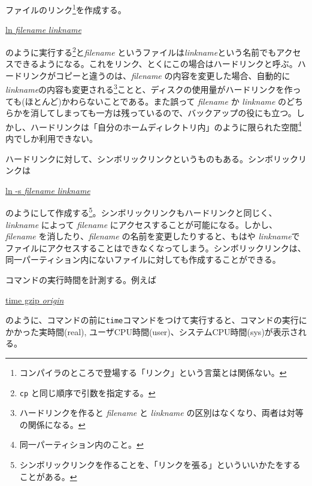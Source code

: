 \begin{itemize}

          ファイルのリンク\footnote{コンパイラのところで登場する「リンク」という言葉とは関係ない。}を作成する。
          \begin{commandline2}
              \prompt \underline{ln \textit{filename} \textit{linkname}}
          \end{commandline2} \noindent
          のように実行する\footnote{{\texttt{cp}} と同じ順序で引数を指定する。}と\textit{filename} というファイルは\textit{linkname}という名前でもアクセスできるようになる。これをリンク、とくにこの場合はハードリンクと呼ぶ。ハードリンクがコピーと違うのは、\textit{filename} の内容を変更した場合、自動的に \textit{linkname}の内容も変更される\footnote{ハードリンクを作ると \textit{filename} と \textit{linkname} の区別はなくなり、両者は対等の関係になる。}ことと、ディスクの使用量がハードリンクを作っても(ほとんど)かわらないことである。また誤って \textit{filename} か \textit{linkname} のどちらかを消してしまっても一方は残っているので、バックアップの役にも立つ。しかし、ハードリンクは「自分のホームディレクトリ内」のように限られた空間\footnote{同一パーティション内のこと。}内でしか利用できない。

          ハードリンクに対して、シンボリックリンクというものもある。シンボリックリンクは
          \begin{commandline2}
              \prompt \underline{ln -s \textit{filename} \textit{linkname}}
          \end{commandline2} \noindent
          のようにして作成する\footnote{シンボリックリンクを作ることを、「リンクを張る」といういいかたをすることがある。}。シンボリックリンクもハードリンクと同じく、\textit{linkname} によって \textit{filename} にアクセスすることが可能になる。しかし、 \textit{filename} を消したり、\textit{filename} の名前を変更したりすると、もはや \textit{linkname}でファイルにアクセスすることはできなくなってしまう。シンボリックリンクは、同一パーティション内にないファイルに対しても作成することができる。


          コマンドの実行時間を計測する。例えば
          \begin{commandline2}
              \prompt \underline{time gzip \textit{origin}}
          \end{commandline2} \noindent
          のように、コマンドの前に\texttt{time}コマンドをつけて実行すると、コマンドの実行にかかった実時間(real), ユーザCPU時間(user)、システムCPU時間(sys)が表示される。

\end{itemize}

